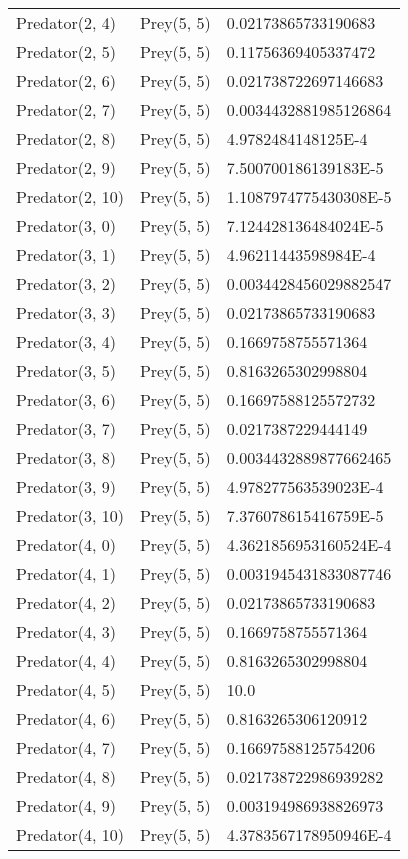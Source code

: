 \begin{longtable}{| p{} | p{} | p{} |}
Predator(2, 4) & Prey(5, 5) &0.02173865733190683\\
Predator(2, 5) & Prey(5, 5) &0.11756369405337472\\
Predator(2, 6) & Prey(5, 5) &0.021738722697146683\\
Predator(2, 7) & Prey(5, 5) &0.0034432881985126864\\
Predator(2, 8) & Prey(5, 5) &4.9782484148125E-4\\
Predator(2, 9) & Prey(5, 5) &7.500700186139183E-5\\
Predator(2, 10) & Prey(5, 5) &1.1087974775430308E-5\\
Predator(3, 0) & Prey(5, 5) &7.124428136484024E-5\\
Predator(3, 1) & Prey(5, 5) &4.96211443598984E-4\\
Predator(3, 2) & Prey(5, 5) &0.0034428456029882547\\
Predator(3, 3) & Prey(5, 5) &0.02173865733190683\\
Predator(3, 4) & Prey(5, 5) &0.1669758755571364\\
Predator(3, 5) & Prey(5, 5) &0.8163265302998804\\
Predator(3, 6) & Prey(5, 5) &0.16697588125572732\\
Predator(3, 7) & Prey(5, 5) &0.0217387229444149\\
Predator(3, 8) & Prey(5, 5) &0.0034432889877662465\\
Predator(3, 9) & Prey(5, 5) &4.978277563539023E-4\\
Predator(3, 10) & Prey(5, 5) &7.376078615416759E-5\\
Predator(4, 0) & Prey(5, 5) &4.3621856953160524E-4\\
Predator(4, 1) & Prey(5, 5) &0.0031945431833087746\\
Predator(4, 2) & Prey(5, 5) &0.02173865733190683\\
Predator(4, 3) & Prey(5, 5) &0.1669758755571364\\
Predator(4, 4) & Prey(5, 5) &0.8163265302998804\\
Predator(4, 5) & Prey(5, 5) &10.0\\
Predator(4, 6) & Prey(5, 5) &0.8163265306120912\\
Predator(4, 7) & Prey(5, 5) &0.16697588125754206\\
Predator(4, 8) & Prey(5, 5) &0.021738722986939282\\
Predator(4, 9) & Prey(5, 5) &0.003194986938826973\\
Predator(4, 10) & Prey(5, 5) &4.3783567178950946E-4\\

\end{longtable}
